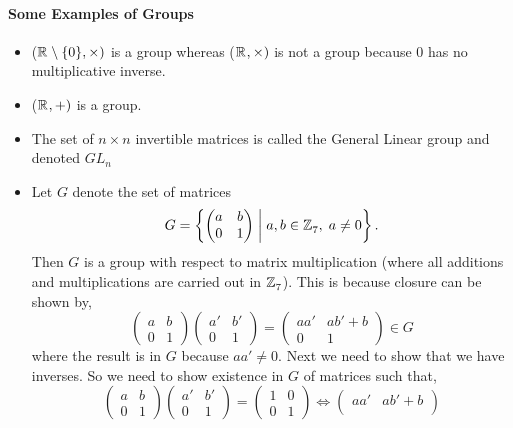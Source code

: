 \documentclass[MathsNotesBase.tex]{subfiles}
\begin{document}
{		\paragraph*{Some Examples of Groups}
		\begin{itemize}
		\item{ ($\mathbb{R}^{} \setminus \{0\}, \times)$ } is a group whereas ($\mathbb{R}^{}, \times)$ is not a group because $0$ has no multiplicative inverse.
		\item{ ($\mathbb{R}^{}, +)$ } is a group.
		\item{ The set of $n \times n$ invertible matrices is called the General Linear group and denoted $GL_n$  }
		\item{Let $G$ denote the set of matrices
			\[ G = \left\{
				\begin{pmatrix}
					a & b \\
					0 & 1
				\end{pmatrix}
			\; \middle\vert \; a,b \in \mathbb{Z}^{}_7, \; a \neq 0 \right\}. \]
			Then $G$ is a group with respect to matrix multiplication (where all additions and multiplications are carried out in $\mathbb{Z}^{}_7$). This is because closure can be shown by,
			\[
				\begin{pmatrix}
				a & b \\
				0 & 1
				\end{pmatrix}
				\begin{pmatrix}
				a' & b' \\
				0 & 1
				\end{pmatrix}
				=
				\begin{pmatrix}
				aa' & ab' + b \\
				0 & 1
				\end{pmatrix} \in G
			\]
			where the result is in $G$ because ${ aa' \neq 0 }$. Next we need to show that we have inverses. So we need to show existence in $G$ of matrices such that,
			\[
				\begin{pmatrix}
				a & b \\
				0 & 1
				\end{pmatrix}
				\begin{pmatrix}
				a' & b' \\
				0 & 1
				\end{pmatrix}
				=
				\begin{pmatrix}
				1 & 0 \\
				0 & 1
				\end{pmatrix} 
				\iff
				\begin{pmatrix}
				aa' & ab' + b \\

\end{pmatrix}\]}
\end{itemize}}
\end{document}
